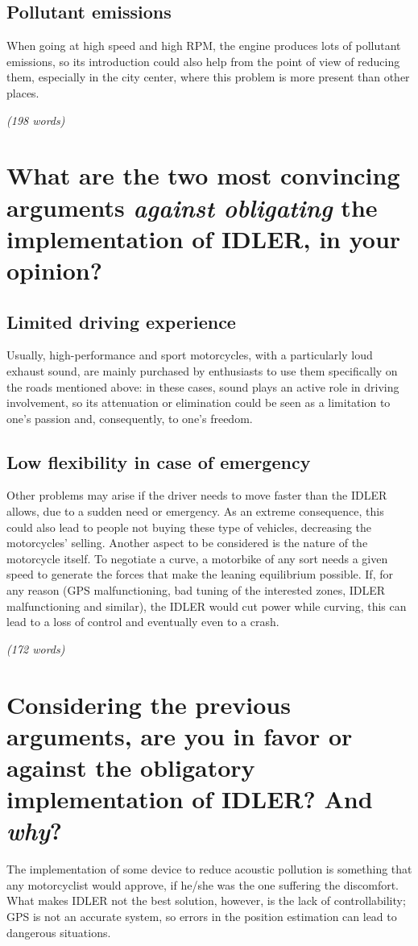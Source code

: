 \subsection{Pollutant emissions}
When going at high speed and high RPM, the engine produces lots of pollutant emissions, so its introduction could also help from the point of view of reducing them, especially in the city center, where this problem is more present than other places.

\emph{(198 words)}

\section{What are the two most convincing arguments \textit{against obligating} the implementation of IDLER, in your opinion?}
\subsection{Limited driving experience}
Usually, high-performance and sport motorcycles, with a particularly loud exhaust sound, are mainly purchased by enthusiasts to use them specifically on the roads mentioned above: in these cases, sound plays an active role in driving involvement, so its attenuation or elimination could be seen as a limitation to one's passion and, consequently, to one's freedom.

\subsection{Low flexibility in case of emergency}
Other problems may arise if the driver needs to move faster than the IDLER allows, due to a sudden need or emergency. As an extreme consequence, this could also lead to people not buying these type of vehicles, decreasing the  motorcycles' selling. Another aspect to be considered is the nature of the motorcycle itself. To negotiate a curve, a motorbike of any sort needs a given speed to generate the forces that make the leaning equilibrium possible. If, for any reason (GPS malfunctioning, bad tuning of the interested zones, IDLER malfunctioning and similar), the IDLER would cut power while curving, this can lead to a loss of control and eventually even to a crash.

\emph{(172 words)}

\section{Considering the previous arguments, are you in favor or against the obligatory implementation of IDLER? And \textit{why}?}
The implementation of some device to reduce acoustic pollution is something that any motorcyclist would approve, if he/she was the one suffering the discomfort. What makes IDLER not the best solution, however, is the lack of controllability; GPS is not an accurate system, so errors in the position estimation can lead to dangerous situations.

